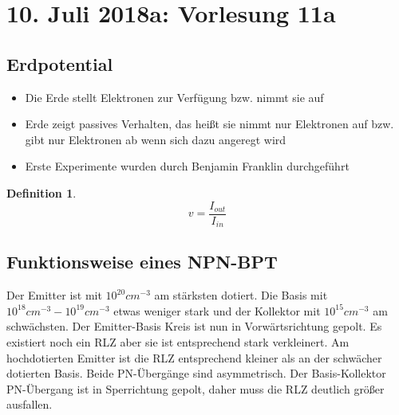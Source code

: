 \documentclass[12pt,a4paper]{report}%
\newtheorem{definition}[satz]{Definition}
\numberwithin{equation}{section}
\numberwithin{equation}{subsection}
\begin{document}
  \section{10. Juli 2018a: Vorlesung 11a}
  \subsection{Erdpotential}
  \begin{itemize}
    \item Die Erde stellt Elektronen zur Verfügung bzw. nimmt sie auf
    \item Erde zeigt passives Verhalten, das heißt sie nimmt nur Elektronen auf bzw. gibt nur Elektronen ab wenn sich dazu angeregt wird
    \item Erste Experimente wurden durch Benjamin Franklin durchgeführt
  \end{itemize}
  \begin{definition}
    \begin{equation}
      v = \frac{I_{out}}{I_{in}}
    \end{equation}
  \end{definition}
    \subsection{Funktionsweise eines NPN-BPT}
    Der Emitter ist mit $10^{20}cm^{-3}$ am stärksten dotiert. Die Basis mit $10^{18}cm^{-3}-10^{19}cm^{-3}$ etwas weniger stark und der Kollektor mit $10^{15}cm^{-3}$ am schwächsten. Der Emitter-Basis Kreis ist nun in Vorwärtsrichtung gepolt. Es existiert noch ein RLZ aber sie ist entsprechend stark verkleinert. Am hochdotierten Emitter ist die RLZ entsprechend kleiner als an der schwächer dotierten Basis. Beide PN-Übergänge sind asymmetrisch. Der Basis-Kollektor PN-Übergang ist in Sperrichtung gepolt, daher muss die RLZ deutlich größer ausfallen.
\end{document}
